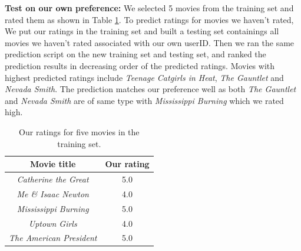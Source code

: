 \textbf{Test on our own preference:} We selected 5 movies from
the training set and rated them as shown in Table
\ref{tab:preference}. To predict ratings for movies we
haven't rated, We put our ratings in the training set and
built a testing set containings all movies we haven't rated
associated with our own userID. Then we ran the same prediction script on the new
training set and testing set, and ranked the prediction
results in decreasing order of the predicted ratings. Movies
with highest predicted ratings include \textit{Teenage
  Catgirls in Heat}, \textit{The Gauntlet} and
\textit{Nevada Smith}. The prediction matches our
preference well as both \textit{The Gauntlet} and
\textit{Nevada Smith} are of same type with
\textit{Mississippi Burning} which we rated high.

\begin{table}[!ht]
  \centering
  \begin{tabular}{c c}
    Movie title & Our rating \\
    \hline
    \textit{Catherine the Great} & 5.0 \\
    \textit{Me \& Isaac Newton} & 4.0 \\
    \textit{Mississippi Burning} & 5.0 \\
    \textit{Uptown Girls} & 4.0 \\
    \textit{The American President} & 5.0\\
  \end{tabular}
  \caption{Our ratings for five movies in the training set.}
  \label{tab:preference}
\end{table}
